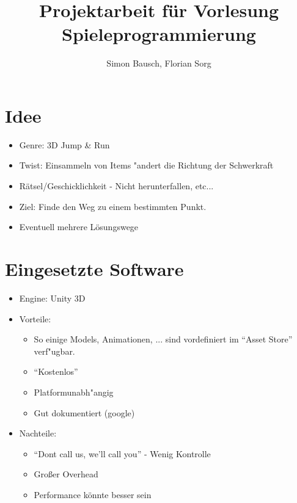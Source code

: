 \documentclass[landscape,compress,table]{beamer}
\title{Projektarbeit f\"ur Vorlesung Spieleprogrammierung}
\author{Simon Bausch, Florian Sorg}
\institute{Hochschule Aalen}
\begin{document}
\begin{frame}
	\titlepage
\end{frame}

\begin{frame}
	\tableofcontents
\end{frame}

\section{Idee}
\begin{frame}
	\begin{itemize}
		\item
			Genre: 3D Jump \& Run
		\item
			Twist: Einsammeln von Items "andert die
			Richtung der Schwerkraft
		\item
			Rätsel/Geschicklichkeit - Nicht herunterfallen, etc...
		\item
			Ziel: Finde den Weg zu einem bestimmten Punkt.
		\item
			Eventuell mehrere Lösungswege
	\end{itemize}
\end{frame}

\section{Eingesetzte Software}
\begin{frame}
	\begin{itemize}
		\item
			Engine: Unity 3D
		\item
			Vorteile:
			\begin{itemize}
				\item So einige Models, Animationen, ...
			sind vordefiniert im ``Asset Store''
			verf"ugbar.
				\item ``Kostenlos''
				\item Platformunabh"angig
				\item Gut dokumentiert (google)
			\end{itemize}
			\item
			Nachteile:
			\begin{itemize}
				\item ``Dont call us, we'll call you'' - Wenig Kontrolle
				\item Großer Overhead
				\item Performance könnte besser sein
			\end{itemize}
	\end{itemize}
\end{frame}
\end{document}
